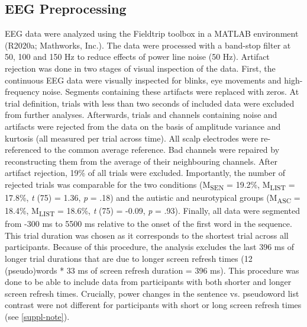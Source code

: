 \subsection*{EEG Preprocessing} \label{preprocessing}
EEG data were analyzed using the Fieldtrip toolbox \citep{oostenveld2011} in a MATLAB environment (R2020a; Mathworks, Inc.). The data were processed with a band-stop filter at 50, 100 and 150 Hz to reduce effects of power line noise (50 Hz). Artifact rejection was done in two stages of visual inspection of the data. First, the continuous EEG data were visually inspected for blinks, eye movements and high-frequency noise. Segments containing these artifacts were replaced with zeros. At trial definition, trials with less than two seconds of included data were excluded from further analyses. Afterwards, trials and channels containing noise and artifacts were rejected from the data on the basis of amplitude variance and kurtosis (all measured per trial across time). All scalp electrodes were re-referenced to the common average reference. Bad channels were repaired by reconstructing them from the average of their neighbouring channels. After artifact rejection, 19\% of all trials were excluded. Importantly, the number of rejected trials was comparable for the two conditions (M\textsubscript{SEN} = 19.2\%, M\textsubscript{LIST} = 17.8\%, \textit{t} (75) = 1.36, \textit{p} = .18) and the autistic and neurotypical groups (M\textsubscript{ASC} = 18.4\%, M\textsubscript{LIST} = 18.6\%, \textit{t} (75) = -0.09, \textit{p} = .93). Finally, all data were segmented from -300 ms to 5500 ms relative to the onset of the first word in the sequence. This trial duration was chosen as it corresponds to the shortest trial across all participants. Because of this procedure, the analysis excludes the last 396 ms of longer trial durations that are due to longer screen refresh times (12 (pseudo)words * 33 ms of screen refresh duration = 396 ms). This procedure was done to be able to include data from participants with both shorter and longer screen refresh times. Crucially, power changes in the sentence vs. pseudoword list contrast were not different for participants with short or long screen refresh times (see \ref{suppl-note}).

